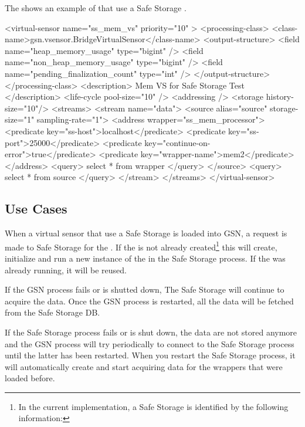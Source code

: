 The  shows an example of \vsd that use a Safe Storage \wrapper.

\begin{xmlcode}[caption={Sample of Email Notification VSD file}, label=listing:xml:safestorage_vsd]
<virtual-sensor name="ss_mem_vs" priority="10" >
	<processing-class>
		<class-name>gsn.vsensor.BridgeVirtualSensor</class-name>
		<output-structure>
			<field name="heap_memory_usage" type="bigint" />
			<field name="non_heap_memory_usage" type="bigint" />
			<field name="pending_finalization_count" type="int" />
		</output-structure>
	</processing-class>
	<description> Mem VS for Safe Storage Test </description>
	<life-cycle pool-size="10" />
	<addressing />
	<storage history-size="10"/>
	<streams>
		<stream name="data">
			<source alias="source" storage-size="1" sampling-rate="1">
				<address wrapper="ss_mem_processor">
					<predicate key="ss-host">localhost</predicate>
					<predicate key="ss-port">25000</predicate>
					<predicate key="continue-on-error">true</predicate>
					<predicate key="wrapper-name">mem2</predicate>
				</address>
				<query> select * from wrapper </query>
			</source>
			<query> select * from source </query>
		</stream>
	</streams>
</virtual-sensor>
\end{xmlcode}

\subsection{Use Cases}

When a virtual sensor that use a Safe Storage \wrapper is loaded into GSN,
a request is made to Safe Storage for the \wrapper. If the \wrapper is not already
created\footnote{In the current implementation, a Safe Storage \wrapper is identified by the following information:\newline{}
} 
this will create, initialize and run a new instance of the \wrapper in the Safe Storage process.
If the \wrapper was already running, it will be reused.

If the GSN process fails or is shutted down, The Safe Storage \wrapper will continue to acquire the data. Once the GSN process is
restarted, all the data will be fetched from the Safe Storage DB.

If the Safe Storage process fails or is shut down, the data are not stored anymore and the GSN process will try periodically to 
connect to the Safe Storage process until the latter has been restarted.
When you restart the Safe Storage process, it will automatically create and start acquiring data for the wrappers that were loaded before.

